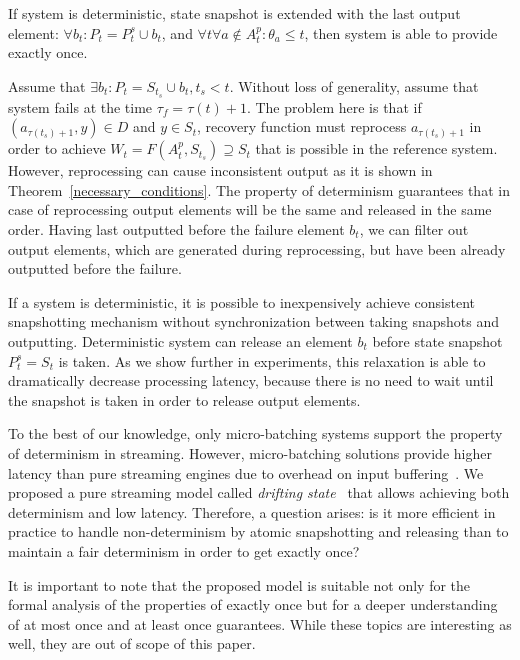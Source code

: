 \begin{theorem}
\label{determinism}
If system is deterministic, state snapshot is extended with the last output element: $\forall{b_t}:P_t=P^{s}_t \cup b_t$, and $\forall{t}\forall{a}\notin{A^{p}_t} : \theta_a \leq t$, then system is able to provide exactly once.
\end{theorem}
\begin{sketch}
Assume that $\exists{b_t}:P_t = S_{t_s} \cup b_t, t_s < t$. Without loss of generality, assume that system fails at the time $\tau_f = \tau(t)+1$. The problem here is that if $(a_{\tau(t_s)+1},y)\in{D}$ and $y\in{S_t}$, recovery function must reprocess $a_{\tau(t_s)+1}$ in order to achieve $W_t=F(A^{p}_t,S_{t_s})\supseteq{S_t}$ that is possible in the reference system. However, reprocessing can cause inconsistent output as it is shown in Theorem~\ref{necessary_conditions}. The property of determinism guarantees that in case of reprocessing output elements will be the same and released in the same order. Having last outputted before the failure element $b_t$, we can filter out output elements, which are generated during reprocessing, but have been already outputted before the failure.
\end{sketch}

If a system is deterministic, it is possible to inexpensively achieve consistent snapshotting mechanism without synchronization between taking snapshots and outputting. Deterministic system can release an element $b_t$ before state snapshot $P^{s}_t=S_t$ is taken. As we show further in experiments, this relaxation is able to dramatically decrease processing latency, because there is no need to wait until the snapshot is taken in order to release output elements.

To the best of our knowledge, only micro-batching systems support the property of determinism in streaming. However, micro-batching solutions provide higher latency than pure streaming engines due to overhead on input buffering~\cite{karimov2018benchmarking}. We proposed a pure streaming model called {\em drifting state}~\cite{we2018adbis} that allows achieving both determinism and low latency. Therefore, a question arises: is it more efficient in practice to handle non-determinism by atomic snapshotting and releasing than to maintain a fair determinism in order to get exactly once? 

It is important to note that the proposed model is suitable not only for the formal analysis of the properties of exactly once but for a deeper understanding of at most once and at least once guarantees. While these topics are interesting as well, they are out of scope of this paper. 

